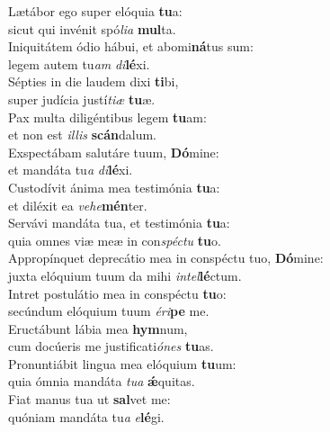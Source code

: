 \evenverse Lætábor ego super elóquia \textbf{tu}a:~\*\\
\evenverse sicut qui invénit spó\textit{li}\textit{a} \textbf{mul}ta.\\
\oddverse Iniquitátem ódio hábui, et abomi\textbf{ná}tus sum:~\*\\
\oddverse legem autem tu\textit{am} \textit{di}\textbf{lé}xi.\\
\evenverse Sépties in die laudem dixi \textbf{ti}bi,~\*\\
\evenverse super judícia justí\textit{ti}\textit{æ} \textbf{tu}æ.\\
\oddverse Pax multa diligéntibus legem \textbf{tu}am:~\*\\
\oddverse et non est \textit{il}\textit{lis} \textbf{scán}dalum.\\
\evenverse Exspectábam salutáre tuum, \textbf{Dó}mine:~\*\\
\evenverse et mandáta tu\textit{a} \textit{di}\textbf{lé}xi.\\
\oddverse Custodívit ánima mea testimónia \textbf{tu}a:~\*\\
\oddverse et diléxit ea \textit{ve}\textit{he}\textbf{mén}ter.\\
\evenverse Servávi mandáta tua, et testimónia \textbf{tu}a:~\*\\
\evenverse quia omnes viæ meæ in con\textit{spé}\textit{ctu} \textbf{tu}o.\\
\oddverse Appropínquet deprecátio mea in conspéctu tuo, \textbf{Dó}mine:~\*\\
\oddverse juxta elóquium tuum da mihi \textit{in}\textit{tel}\textbf{lé}ctum.\\
\evenverse Intret postulátio mea in conspéctu \textbf{tu}o:~\*\\
\evenverse secúndum elóquium tuum \textit{é}\textit{ri}\textbf{pe} me.\\
\oddverse Eructábunt lábia mea \textbf{hym}num,~\*\\
\oddverse cum docúeris me justificati\textit{ó}\textit{nes} \textbf{tu}as.\\
\evenverse Pronuntiábit lingua mea elóquium \textbf{tu}um:~\*\\
\evenverse quia ómnia mandáta \textit{tu}\textit{a} \textbf{ǽ}quitas.\\
\oddverse Fiat manus tua ut \textbf{sal}vet me:~\*\\
\oddverse quóniam mandáta tu\textit{a} \textit{e}\textbf{lé}gi.\\
